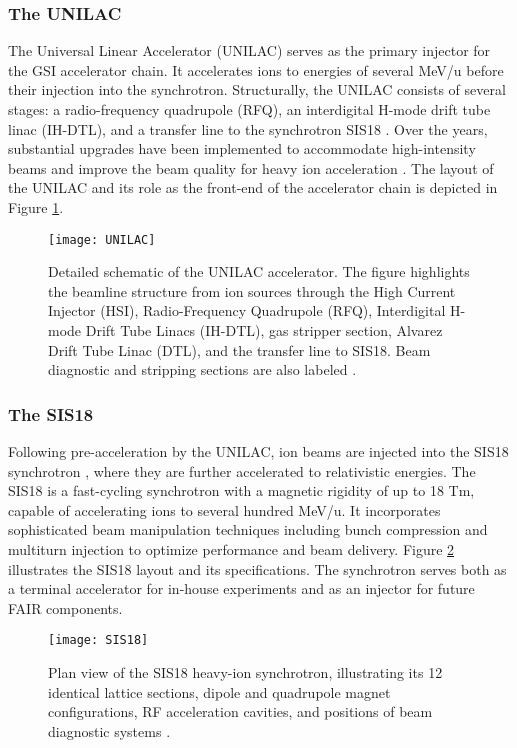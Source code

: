 \subsubsection{The UNILAC}

The Universal Linear Accelerator (UNILAC) \cite{vormann_high_2023} serves as the primary injector for the GSI accelerator chain. It accelerates ions to energies of several MeV/u before their injection into the synchrotron. Structurally, the UNILAC consists of several stages: a radio-frequency quadrupole (RFQ), an interdigital H-mode drift tube linac (IH-DTL), and a transfer line to the synchrotron SIS18 \cite{barth_high_2022}. Over the years, substantial upgrades have been implemented to accommodate high-intensity beams and improve the beam quality for heavy ion acceleration . The layout of the UNILAC and its role as the front-end of the accelerator chain is depicted in Figure \ref{fig:UNILAC}.


\begin{figure}
	\texttt{[image: UNILAC]}
	\caption{Detailed schematic of the UNILAC accelerator. The figure highlights the beamline structure from ion sources through the High Current Injector (HSI), Radio-Frequency Quadrupole (RFQ), Interdigital H-mode Drift Tube Linacs (IH-DTL), gas stripper section, Alvarez Drift Tube Linac (DTL), and the transfer line to SIS18. Beam diagnostic and stripping sections are also labeled \cite{barth_high_2022}.}
	\label{fig:UNILAC}
\end{figure}


\subsubsection{The SIS18}

Following pre-acceleration by the UNILAC, ion beams are injected into the SIS18 synchrotron \cite{singh2014tune}, where they are further accelerated to relativistic energies. The SIS18 is a fast-cycling synchrotron with a magnetic rigidity of up to 18 Tm, capable of accelerating ions to several hundred MeV/u. It incorporates sophisticated beam manipulation techniques including bunch compression and multiturn injection to optimize performance and beam delivery. Figure \ref{fig:SIS18} illustrates the SIS18 layout and its specifications. The synchrotron serves both as a terminal accelerator for in-house experiments and as an injector for future FAIR components.

\begin{figure}
	\centering
	\texttt{[image: SIS18]}
	\caption{Plan view of the SIS18 heavy-ion synchrotron, illustrating its 12 identical lattice sections, dipole and quadrupole magnet configurations, RF acceleration cavities, and positions of beam diagnostic systems \cite{gsiSIS18Sections}.}
	\label{fig:SIS18}
\end{figure}

